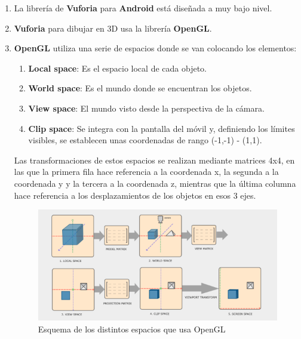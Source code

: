 \begin{enumerate}
    \item La librería de \textbf{Vuforia} para \textbf{Android} está diseñada a muy bajo nivel.
    \item \textbf{Vuforia} para dibujar en 3D usa la librería \textbf{OpenGL}.
    \item \textbf{OpenGL} utiliza una serie de espacios donde se van colocando los elementos: 
    \begin{enumerate}
        \item \textbf{Local space}: Es el espacio local de cada objeto.
        \item \textbf{World space}: Es el mundo donde se encuentran los objetos.
        \item \textbf{View space}: El mundo visto desde la perspectiva de la cámara.
        \item \textbf{Clip space}: Se integra con la pantalla del móvil y, definiendo los límites visibles, se establecen unas coordenadas de rango (-1,-1) - (1,1).
    \end{enumerate}
    \begin{flushleft}
        Las transformaciones de estos espacios se realizan mediante matrices 4x4, 
        en las que la primera fila hace referencia a la coordenada x, la segunda a la coordenada y y la 
        tercera a la coordenada z, mientras que la última columna hace referencia a los desplazamientos 
        de los objetos en esos 3 ejes.
        \end{flushleft}
        

        
            \begin{figure}[H]
                \centering
                \includegraphics[width=5in]{figures/space-transformation.png}
                \caption{Esquema de los distintos espacios que usa OpenGL}
            \end{figure}


\end{enumerate}
